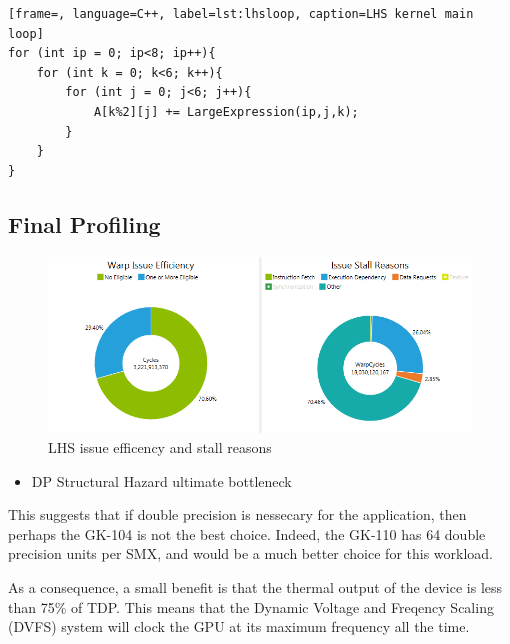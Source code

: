 \documentclass[11pt, oneside, a4paper]{article}
\begin{document}
\begin{lstlisting}[frame=, language=C++, label=lst:lhsloop, caption=LHS kernel main loop]
for (int ip = 0; ip<8; ip++){
	for (int k = 0; k<6; k++){
		for (int j = 0; j<6; j++){
			A[k%2][j] += LargeExpression(ip,j,k);
		}
	}
}
\end{lstlisting}


\subsection{Final Profiling} %
\label{sub:final_profiling}

\begin{figure}[tb]
	\begin{center}
		\includegraphics[width=\textwidth]{"LHS efficency and stall reason"}
	\end{center}
	\caption{LHS issue efficency and stall reasons}
	\label{fig:issue_eff_and_stall_reasons}
\end{figure}

\begin{itemize}
	\item DP Structural Hazard ultimate bottleneck
\end{itemize}

This suggests that if double precision is nessecary for the application, then perhaps the GK-104 is not the best choice. Indeed, the GK-110 has 64 double precision units per SMX, and would be a much better choice for this workload.

As a consequence, a small benefit is that the thermal output of the device is less than 75\% of TDP. This means that the Dynamic Voltage and Freqency Scaling (DVFS) system will clock the GPU at its maximum frequency all the time.



\end{document}
